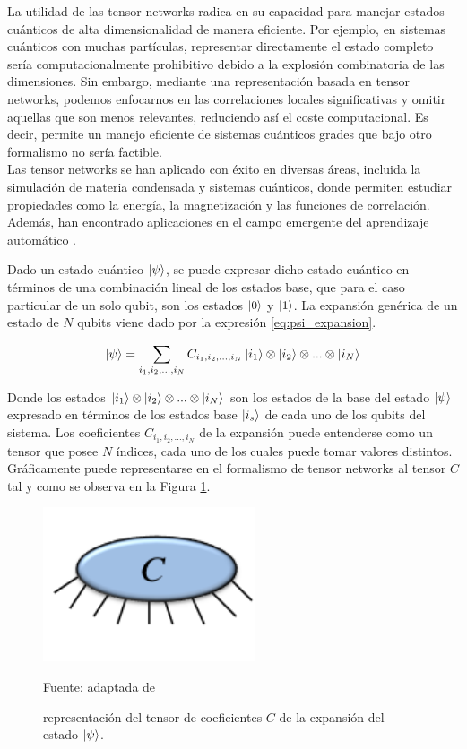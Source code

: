 La utilidad de las tensor networks radica en su capacidad para manejar estados cuánticos de alta dimensionalidad de manera eficiente. Por ejemplo, en sistemas cuánticos con muchas partículas, representar directamente el estado completo sería computacionalmente prohibitivo debido a la explosión combinatoria de las dimensiones. Sin embargo, mediante una representación basada en tensor networks, podemos enfocarnos en las correlaciones locales significativas y omitir aquellas que son menos relevantes, reduciendo así el coste computacional. Es decir, permite un manejo eficiente de sistemas cuánticos grades que bajo otro formalismo no sería factible. \\


Las tensor networks se han aplicado con éxito en diversas áreas, incluida la simulación de materia condensada y sistemas cuánticos, donde permiten estudiar propiedades como la energía, la magnetización y las funciones de correlación. Además, han encontrado aplicaciones en el campo emergente del aprendizaje automático \citep{chen}. 

\newpage

Dado un estado cuántico $\ket{\psi}$, se puede expresar dicho estado cuántico en términos de una combinación lineal de los estados base, que para el caso particular de un solo qubit, son los estados $\ket{0}$ y $\ket{1}$. La expansión genérica de un estado de $N$ qubits viene dado por la expresión \ref{eq:psi_expansion}.

\begin{equation}
    \ket{\psi} = \sum_{i_1, i_2, ...,i_N} C_{i_1, i_2, ...,i_N} \ket{i_1}\otimes\ket{i_2}\otimes...\otimes \ket{i_N}
    \label{eq:psi_expansion}
\end{equation}

Donde los estados $\ket{i_1}\otimes\ket{i_2}\otimes...\otimes \ket{i_N}$ son los estados de la base del estado $\ket{\psi}$ expresado en términos de los estados base $\ket{i_s}$ de cada uno de los qubits del sistema. Los coeficientes $C_{i_1, i_2, ...,i_N}$ de la expansión puede entenderse como un tensor que posee $N$ índices, cada uno de los cuales puede tomar valores distintos. Gráficamente puede representarse en el formalismo de tensor networks al tensor $C$ tal y como se observa en la Figura \ref{fig:orus}.

\begin{figure}[!ht]
    \centering
    \includegraphics[scale = 0.8]{img/03_tensor_coeficientes.png}
    \caption{representación del tensor de coeficientes $C$  de la expansión del estado $\ket{\psi}$.}
    Fuente: adaptada de \cite{orus}
    \label{fig:orus}
\end{figure}


